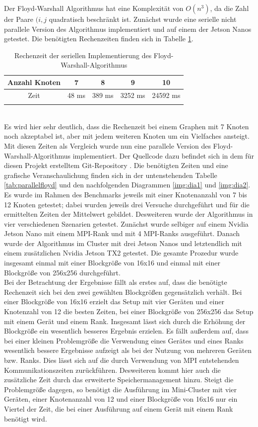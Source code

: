 \documentclass[doktyp=semarbeit, sprache=german]{TUBAFarbeiten}
\begin{document}
Der Floyd-Warshall Algorithmus hat eine Komplexität von $O(n^3)$, da die Zahl der Paare $(i,j$ quadratisch beschränkt ist.
Zunächst wurde eine serielle nicht parallele Version des Algorithmus implementiert und auf einem der Jetson Nanos getestet. Die benötigten Rechenzeiten finden sich in Tabelle \ref{tab:seriell}.
\begin{table}[]
\centering
\begin{tabular}{@{}ccccc@{}}
\multicolumn{1}{c|}{Anzahl Knoten} & 7     & 8      & 9       & 10       \\ \midrule
\multicolumn{1}{c|}{Zeit}          & 48 ms & 389 ms & 3252 ms & 24592 ms \\
\multicolumn{5}{c}{}                                                    
\end{tabular}
\caption{Rechenzeit der seriellen Implementierung des Floyd-Warshall-Algorithmus}
\label{tab:seriell}
\end{table}
\\Es wird hier sehr deutlich, dass die Rechenzeit bei einem Graphen mit 7 Knoten noch akzeptabel ist, aber mit jedem weiteren Knoten um ein Vielfaches ansteigt. Mit diesen Zeiten als Vergleich wurde nun eine parallele Version des Floyd-Warshall-Algorithmus implementiert. Der Quellcode dazu befindet sich in dem für diesen Projekt erstelltem Git-Repository \cite{Git}. Die benötigten Zeiten und eine grafische Veranschaulichung finden sich in der untenstehenden Tabelle \ref{tab:parallelfloyd} und den nachfolgenden Diagrammen \ref{img:dia1} und \ref{img:dia2}. 
\\Es wurde im Rahmen des Benchmarks jeweils mit einer Knotenanzahl von 7 bis 12 Knoten getestet; dabei wurden jeweils drei Versuche durchgeführt und für die ermittelten Zeiten der Mittelwert gebildet. Desweiteren wurde der Algorithmus in vier verschiedenen Szenarien getestet. Zunächst wurde selbiger auf einem Nvidia Jetson Nano mit einem MPI-Rank und mit 4 MPI-Ranks ausgeführt. Danach wurde der Algorithmus im Cluster mit drei Jetson Nanos und letztendlich mit einem zusätzlichen Nvidia Jetson TX2 getestet. Die gesamte Prozedur wurde insgesamt einmal mit einer Blockgröße von 16x16 und einmal mit einer Blockgröße von 256x256 durchgeführt. 
\\Bei der Betrachtung der Ergebnisse fällt als erstes auf, dass die benötigte Rechenzeit sich bei den zwei gewählten Blockgrößen gegensätzlich verhält. Bei einer Blockgröße von 16x16 erzielt das Setup mit vier Geräten und einer Knotenzahl von 12 die besten Zeiten, bei einer Blockgröße von 256x256 das Setup mit einem Gerät und einem Rank. Insgesamt lässt sich durch die Erhöhung der Blockgröße ein wesentlich besseres Ergebnis erzielen. Es fällt außerdem auf, dass bei einer kleinen Problemgröße die Verwendung eines Gerätes und eines Ranks wesentlich bessere Ergebnisse aufzeigt als bei der Nutzung von mehreren Geräten bzw. Ranks. Dies lässt sich auf die durch Verwendung von MPI entstehenden Kommunikationszeiten zurückführen. Desweiteren kommt hier auch die zusätzliche Zeit durch das erweiterte Speichermanagement hinzu. Steigt die Problemgröße dagegen, so benötigt die Ausführung im Mini-Cluster mit vier Geräten, einer Knotenanzahl von 12 und einer Blockgröße von 16x16 nur ein Viertel der Zeit, die bei einer Ausführung auf einem Gerät mit einem Rank benötigt wird.
\end{document}
